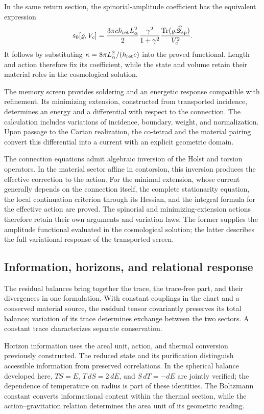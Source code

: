 In the same return section, the spinorial-amplitude coefficient has the
equivalent expression
\[
 s_0[\varrho,V_c]
 =\frac{3\pi c\hbar_{\rm ret}L_\alpha^2}{2}
   \frac{\gamma^2}{1+\gamma^2}
   \frac{\operatorname{Tr}(\varrho\widehat{\mathscr Q}_{\rm sp})}{V_c^2}.
\]
It follows by substituting
\(\kappa=8\pi L_\alpha^2/(\hbar_{\rm ret}c)\) into the proved
functional. Length and action therefore fix its coefficient, while the
state and volume retain their material roles in the cosmological solution.

The memory screen provides soldering and an energetic response
compatible with refinement. Its minimizing extension,
constructed from transported incidence, determines an
energy and a differential with respect to the connection. The calculation
includes variations of incidence, boundary, weight, and normalization.
Upon passage to the Cartan realization, the co-tetrad and the material
pairing convert this differential into a current with an explicit
geometric domain.

The connection equations admit algebraic inversion of the
Holst and torsion operators. In the material sector affine in
contorsion, this inversion produces the effective correction to
the action. For the minimal extension, whose current generally
depends on the connection itself, the complete stationarity equation,
the local continuation criterion through its Hessian, and the
integral formula for the effective action are proved. The spinorial and
minimizing-extension actions therefore retain their own arguments and
variation laws. The former supplies the amplitude functional evaluated
in the cosmological solution; the latter describes the full variational
response of the transported screen.

\subsection{Information, horizons, and relational response}

The residual balances bring together the trace, the
trace-free part, and their divergences in one formulation. With constant
couplings in the chart and a conserved material source, the residual tensor
covariantly preserves its total balance; variation of its
trace determines exchange between the two sectors. A constant trace
characterizes separate conservation.

Horizon information uses the areal unit,
action, and thermal conversion previously constructed.
The reduced state and its purification distinguish accessible
information from preserved correlations. In the spherical balance
developed here, \(TS=E\),
\(T\,dS=2\,dE\), and \(S\,dT=-dE\) are jointly verified;
the dependence of temperature on radius is part of these identities.
The Boltzmann constant converts informational content
within the thermal section, while the action--gravitation relation
determines the area unit of its geometric reading.

